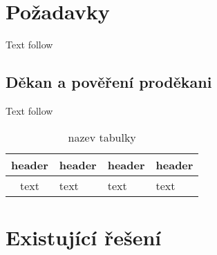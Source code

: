  
 \chapter{Požadavky}
 Text follow
 
 \section{Děkan a pověření proděkani}
 Text follow

\begin{table}[H]
\begin{center}
		\begin{tabular}{ | c | p{6cm} | l | p{2cm} |}
			\hline
			header & header & header & header \\ \hline
			text & text & text & text \\
			\hline		
		\end{tabular}
\end{center}
\caption{nazev tabulky}
\label{tab:errors}
\end{table}

\chapter{Existující řešení}